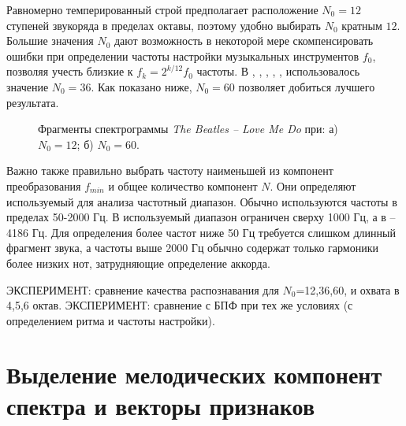 Равномерно темперированный строй предполагает расположение $N_0=12$ ступеней
звукоряда в пределах октавы, поэтому удобно выбирать $N_0$ кратным $12$. Большие
значения $N_0$ дают возможность в некоторой мере скомпенсировать ошибки при
определении частоты настройки музыкальных инструментов $f_0$, позволяя учесть
близкие к $f_k = 2^{k/12} f_0$ частоты. В \cite{Bello2005}, \cite{Lee2006},
\cite{Mauch2008}, \cite{Oudre2009}, \cite{Cho2010}, \cite{Cho2011}
использовалось значение $N_0=36$. Как показано ниже, $N_0=60$ позволяет добиться
лучшего результата.

\begin{figure}[h]
  \begin{minipage}[h]{0.49\linewidth}
  \end{minipage}
  \hfill
  \begin{minipage}[h]{0.49\linewidth}
  \end{minipage}
  \caption{Фрагменты спектрограммы \emph{The Beatles -- Love Me Do} при: а)
  $N_0=12$; б) $N_0=60$.}
  \label{img:spectb}  
\end{figure}

Важно также правильно выбрать частоту наименьшей из компонент преобразования
$f_{min}$ и общее количество компонент $N$. Они определяют используемый для
анализа частотный диапазон. Обычно используются частоты в пределах 50-2000 Гц.
В \cite{Weller2009} используемый диапазон ограничен сверху 1000 Гц, а в
\cite{Cho2011} -- 4186 Гц. Для определения более частот ниже 50 Гц требуется
слишком длинный фрагмент звука, а частоты выше 2000 Гц обычно содержат только
гармоники более низких нот, затрудняющие определение аккорда.

ЭКСПЕРИМЕНТ: сравнение качества распознавания для $N_0$=12,36,60, и
охвата в 4,5,6 октав.
ЭКСПЕРИМЕНТ: сравнение с БПФ при тех же условиях (с определением ритма и частоты
настройки).


\section{Выделение мелодических компонент спектра и векторы признаков}
\label{sect1_feat}


